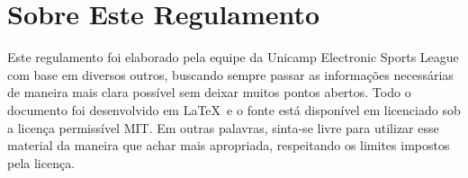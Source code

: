 \section{Sobre Este Regulamento}

Este regulamento foi elaborado pela equipe da Unicamp Electronic Sports League com base em diversos outros, buscando sempre passar as informações necessárias de maneira mais clara possível sem deixar muitos pontos abertos. Todo o documento foi desenvolvido em \LaTeX\ e o fonte está disponível em  licenciado sob a licença permissível MIT. Em outras palavras, sinta-se livre para utilizar esse material da maneira que achar mais apropriada, respeitando os limites impostos pela licença.
